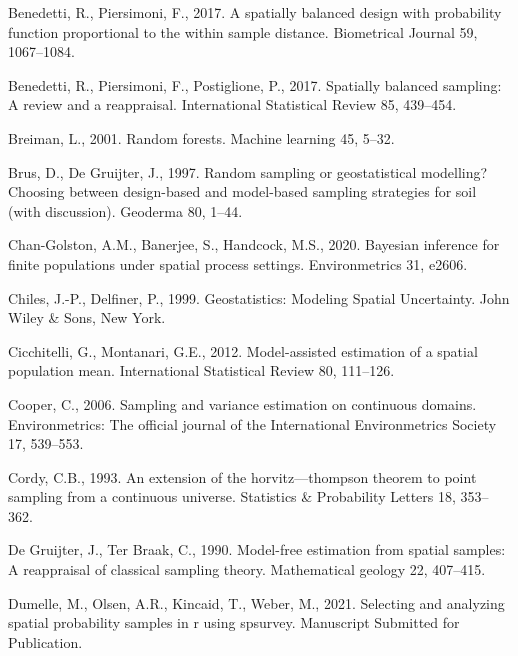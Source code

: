 \documentclass[]{elsarticle} %
\begin{document}
\leavevmode\hypertarget{ref-benedetti2017spatially}{}%
Benedetti, R., Piersimoni, F., 2017. A spatially balanced design with
probability function proportional to the within sample distance.
Biometrical Journal 59, 1067--1084.

\leavevmode\hypertarget{ref-benedetti2017spatiallyreview}{}%
Benedetti, R., Piersimoni, F., Postiglione, P., 2017. Spatially balanced
sampling: A review and a reappraisal. International Statistical Review
85, 439--454.

\leavevmode\hypertarget{ref-breiman2001random}{}%
Breiman, L., 2001. Random forests. Machine learning 45, 5--32.

\leavevmode\hypertarget{ref-brus1997random}{}%
Brus, D., De Gruijter, J., 1997. Random sampling or geostatistical
modelling? Choosing between design-based and model-based sampling
strategies for soil (with discussion). Geoderma 80, 1--44.

\leavevmode\hypertarget{ref-chan2020bayesian}{}%
Chan-Golston, A.M., Banerjee, S., Handcock, M.S., 2020. Bayesian
inference for finite populations under spatial process settings.
Environmetrics 31, e2606.

\leavevmode\hypertarget{ref-chiles1999geostatistics}{}%
Chiles, J.-P., Delfiner, P., 1999. Geostatistics: Modeling Spatial
Uncertainty. John Wiley \& Sons, New York.

\leavevmode\hypertarget{ref-cicchitelli2012model}{}%
Cicchitelli, G., Montanari, G.E., 2012. Model-assisted estimation of a
spatial population mean. International Statistical Review 80, 111--126.

\leavevmode\hypertarget{ref-cooper2006sampling}{}%
Cooper, C., 2006. Sampling and variance estimation on continuous
domains. Environmetrics: The official journal of the International
Environmetrics Society 17, 539--553.

\leavevmode\hypertarget{ref-cordy1993extension}{}%
Cordy, C.B., 1993. An extension of the horvitz---thompson theorem to
point sampling from a continuous universe. Statistics \& Probability
Letters 18, 353--362.

\leavevmode\hypertarget{ref-de1990model}{}%
De Gruijter, J., Ter Braak, C., 1990. Model-free estimation from spatial
samples: A reappraisal of classical sampling theory. Mathematical
geology 22, 407--415.

\leavevmode\hypertarget{ref-dumelle2021spsurvey}{}%
Dumelle, M., Olsen, A.R., Kincaid, T., Weber, M., 2021. Selecting and
analyzing spatial probability samples in r using spsurvey. Manuscript
Submitted for Publication.
\end{document}
